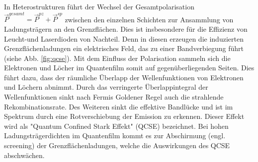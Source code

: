 In Heterostrukturen führt der Wechsel der Gesamtpolarisation $\vec{P}^{gesamt} = \vec{P}^{pz} + \vec{P}^{sp}$ zwischen den einzelnen Schichten zur Ansammlung von Ladungsträgern an den Grenzflächen. Dies ist insbesondere für die Effizienz von Leucht-und Laserdioden von Nachteil. Denn in diesen erzeugen die induzierten Grenzflächenladungen ein elektrisches Feld, das zu einer Bandverbiegung führt (siehe Abb. \ref{fig:qcse}). Mit dem Einfluss der Polarisation sammeln sich die Elektronen und Löcher im Quantenfilm somit auf gegenüberliegenden Seiten. Dies führt dazu, dass der räumliche Überlapp der Wellenfunktionen von Elektronen und Löchern abnimmt. Durch das verringerte Überlappintegral der Wellenfunktionen sinkt nach Fermis Goldener Regel auch die strahlende Rekombinationsrate. Des Weiteren sinkt die effektive Bandlücke und ist im Spektrum durch eine Rotverschiebung der Emission zu erkennen. Dieser Effekt wird als "Quantum Confined Stark Effekt" (QCSE) bezeichnet. Bei hohen Ladungsträgerdichten im Quantenfilm kommt es zur Abschirmung (engl. screening) der Grenzflächenladungen, welche die Auswirkungen des QCSE abschwächen.
